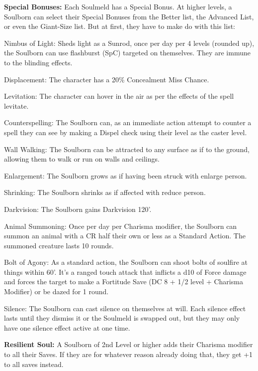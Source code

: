 \textbf{Special Bonuses:} Each Soulmeld has a Special Bonus. At higher levels, a Soulborn can select their Special Bonuses from the Better list, the Advanced List, or even the Giant-Size list. But at first, they have to make do with this list: 
\begin{itemize*}
\item Nimbus of Light: Sheds light as a Sunrod, once per day per 4 levels (rounded up), the Soulborn can use flashburst (SpC) targeted on themselves. They are immune to the blinding effects. 
\item Displacement: The character has a 20\% Concealment Miss Chance. 
\item Levitation: The character can hover in the air as per the effects of the spell levitate. 
\item Counterspelling: The Soulborn can, as an immediate action attempt to counter a spell they can see by making a Dispel check using their level as the caster level. 
\item Wall Walking: The Soulborn can be attracted to any surface as if to the ground, allowing them to walk or run on walls and ceilings. 
\item Enlargement: The Soulborn grows as if having been struck with enlarge person. 
\item Shrinking: The Soulborn shrinks as if affected with reduce person. 
\item Darkvision: The Soulborn gains Darkvision 120'. 
\item Animal Summoning: Once per day per Charisma modifier, the Soulborn can summon an animal with a CR half their own or less as a Standard Action. The summoned creature lasts 10 rounds. 
\item Bolt of Agony: As a standard action, the Soulborn can shoot bolts of soulfire at things within 60'. It's a ranged touch attack that inflicts a d10 of Force damage and forces the target to make a Fortitude Save (DC 8 + 1/2 level + Charisma Modifier) or be dazed for 1 round. 
\item Silence: The Soulborn can cast silence on themselves at will. Each silence effect lasts until they dismiss it or the Soulmeld is swapped out, but they may only have one silence effect active at one time.
\end{itemize*}

\textbf{Resilient Soul:} A Soulborn of 2nd Level or higher adds their Charisma modifier to all their Saves. If they are for whatever reason already doing that, they get +1 to all saves instead. 

